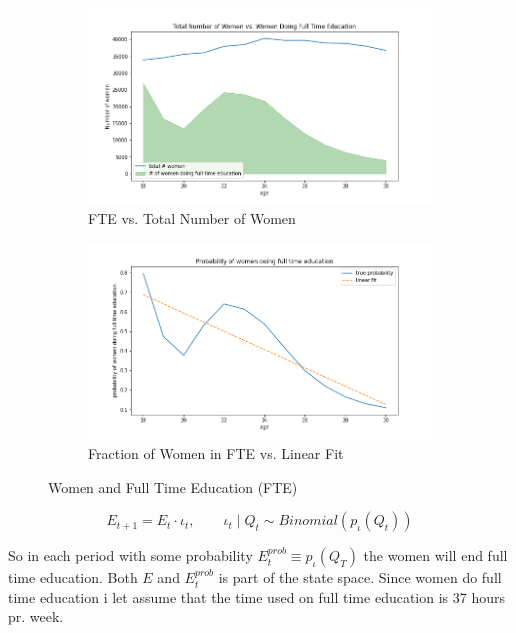 \begin{figure}[ht]
\begin{subfigure}{.5\textwidth}
  \centering
  \includegraphics[width=1\linewidth]{figures/total_women_vs_education.png}
  \caption{FTE vs. Total Number of Women}
  \label{fig:educ_empirical}
\end{subfigure}%
\begin{subfigure}{.5\textwidth}
  \centering
  \includegraphics[width=1\linewidth]{figures/prop_women_doing_full_time_education.png}
  \caption{Fraction of Women in FTE vs. Linear Fit}
  \label{fig:prob_educ_full_time}
\end{subfigure}
    \caption{Women and Full Time Education (FTE)}
    \label{fig:educ_women}
\end{figure}

\begin{equation}
    E_{t+1} = E_{t} \cdot \iota_t, \qquad \iota_t \mid Q_t \sim  Binomial(p_{\iota}(Q_t))
\end{equation}

So in each period with some probability $E^{prob}_t \equiv p_{\iota}(Q_T)$ the women will end full time education. Both $E$ and $E^{prob}_t$ is part of the state space. Since women do full time education i let assume that the time used on full time education is 37 hours pr. week.

